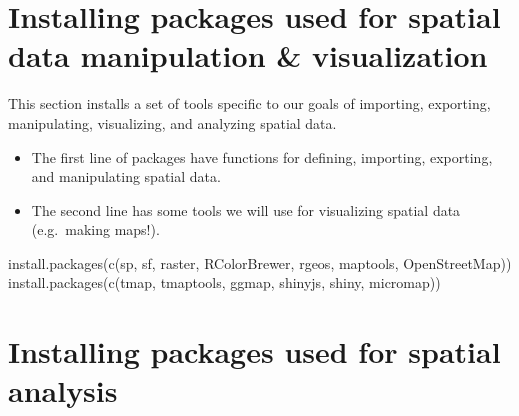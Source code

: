 \documentclass[
]{book}
\newenvironment{Shaded}{\begin{snugshade}}{\end{snugshade}}
\newcommand{\FunctionTok}[1]{\textcolor[rgb]{0.00,0.00,0.00}{#1}}
\newcommand{\NormalTok}[1]{#1}
\newcommand{\StringTok}[1]{\textcolor[rgb]{0.31,0.60,0.02}{#1}}
\providecommand{\tightlist}{%
  \setlength{\itemsep}{0pt}\setlength{\parskip}{0pt}}
\begin{document}
\hypertarget{installing-packages-used-for-spatial-data-manipulation-visualization}{%
\section*{Installing packages used for spatial data manipulation \& visualization}\label{installing-packages-used-for-spatial-data-manipulation-visualization}}

This section installs a set of tools specific to our goals of importing, exporting, manipulating, visualizing, and analyzing spatial data.

\begin{itemize}
\tightlist
\item
  The first line of packages have functions for defining, importing, exporting, and manipulating spatial data.
\item
  The second line has some tools we will use for visualizing spatial data (e.g.~making maps!).
\end{itemize}

\begin{Shaded}
\begin{Highlighting}[]
\FunctionTok{install.packages}\NormalTok{(}\FunctionTok{c}\NormalTok{(}\StringTok{\textquotesingle{}sp\textquotesingle{}}\NormalTok{, }\StringTok{\textquotesingle{}sf\textquotesingle{}}\NormalTok{, }\StringTok{\textquotesingle{}raster\textquotesingle{}}\NormalTok{, }\StringTok{\textquotesingle{}RColorBrewer\textquotesingle{}}\NormalTok{, }\StringTok{\textquotesingle{}rgeos\textquotesingle{}}\NormalTok{, }\StringTok{\textquotesingle{}maptools\textquotesingle{}}\NormalTok{, }\StringTok{\textquotesingle{}OpenStreetMap\textquotesingle{}}\NormalTok{))  }
\FunctionTok{install.packages}\NormalTok{(}\FunctionTok{c}\NormalTok{(}\StringTok{\textquotesingle{}tmap\textquotesingle{}}\NormalTok{, }\StringTok{\textquotesingle{}tmaptools\textquotesingle{}}\NormalTok{, }\StringTok{\textquotesingle{}ggmap\textquotesingle{}}\NormalTok{, }\StringTok{\textquotesingle{}shinyjs\textquotesingle{}}\NormalTok{, }\StringTok{\textquotesingle{}shiny\textquotesingle{}}\NormalTok{, }\StringTok{\textquotesingle{}micromap\textquotesingle{}}\NormalTok{)) }
\end{Highlighting}
\end{Shaded}

\hypertarget{installing-packages-used-for-spatial-analysis}{%
\section*{Installing packages used for spatial analysis}\label{installing-packages-used-for-spatial-analysis}}
\end{document}
